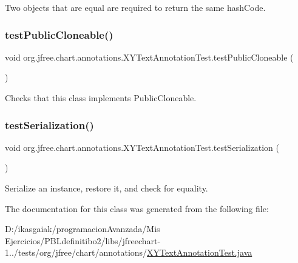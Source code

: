 Two objects that are equal are required to return the same hash\+Code. \mbox{\label{classorg_1_1jfree_1_1chart_1_1annotations_1_1_x_y_text_annotation_test_a35a6f40562d83770db7826bbc2833f52}} 
\subsubsection{\texorpdfstring{test\+Public\+Cloneable()}{testPublicCloneable()}}
{\footnotesize\ttfamily void org.\+jfree.\+chart.\+annotations.\+X\+Y\+Text\+Annotation\+Test.\+test\+Public\+Cloneable (\begin{DoxyParamCaption}{ }\end{DoxyParamCaption})}

Checks that this class implements Public\+Cloneable. \mbox{\label{classorg_1_1jfree_1_1chart_1_1annotations_1_1_x_y_text_annotation_test_afa9dc15174eec3c1d071744a4edfff2d}} 
\subsubsection{\texorpdfstring{test\+Serialization()}{testSerialization()}}
{\footnotesize\ttfamily void org.\+jfree.\+chart.\+annotations.\+X\+Y\+Text\+Annotation\+Test.\+test\+Serialization (\begin{DoxyParamCaption}{ }\end{DoxyParamCaption})}

Serialize an instance, restore it, and check for equality. 

The documentation for this class was generated from the following file\+:\begin{DoxyCompactItemize}
\item 
D\+:/ikasgaiak/programacion\+Avanzada/\+Mis Ejercicios/\+P\+B\+Ldefinitibo2/libs/jfreechart-\/1../tests/org/jfree/chart/annotations/\mbox{\hyperlink{_x_y_text_annotation_test_8java}{X\+Y\+Text\+Annotation\+Test.\+java}}\end{DoxyCompactItemize}
